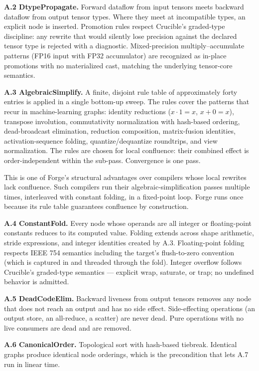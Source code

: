 \textbf{A.2 DtypePropagate.}
Forward dataflow from input tensors meets backward dataflow from output tensor types.
Where they meet at incompatible types, an explicit  node is inserted.
Promotion rules respect Crucible's graded-type discipline: any rewrite that would silently lose precision against the declared tensor type is rejected with a diagnostic.
Mixed-precision multiply--accumulate patterns (FP16 input with FP32 accumulator) are recognized as in-place promotions with no materialized cast, matching the underlying tensor-core semantics.

\textbf{A.3 AlgebraicSimplify.}
A finite, disjoint rule table of approximately forty entries is applied in a single bottom-up sweep.
The rules cover the patterns that recur in machine-learning graphs: identity reductions ($x \cdot 1 = x$, $x + 0 = x$), transpose involution, commutativity normalization with hash-based ordering, dead-broadcast elimination, reduction composition, matrix-fusion identities, activation-sequence folding, quantize/dequantize roundtrips, and view normalization.
The rules are chosen for local confluence: their combined effect is order-independent within the sub-pass.
Convergence is one pass.

This is one of Forge's structural advantages over compilers whose local rewrites lack confluence.
Such compilers run their algebraic-simplification passes multiple times, interleaved with constant folding, in a fixed-point loop.
Forge runs once because its rule table guarantees confluence by construction.

\textbf{A.4 ConstantFold.}
Every  node whose operands are all integer or floating-point constants reduces to its computed value.
Folding extends across shape arithmetic, stride expressions, and integer identities created by A.3.
Floating-point folding respects IEEE 754 semantics including the target's flush-to-zero convention (which is captured in  and threaded through the fold).
Integer overflow follows Crucible's graded-type semantics --- explicit wrap, saturate, or trap; no undefined behavior is admitted.

\textbf{A.5 DeadCodeElim.}
Backward liveness from output tensors removes any node that does not reach an output and has no side effect.
Side-effecting operations (an output store, an all-reduce, a scatter) are never dead.
Pure operations with no live consumers are dead and are removed.

\textbf{A.6 CanonicalOrder.}
Topological sort with hash-based tiebreak.
Identical graphs produce identical node orderings, which is the precondition that lets A.7 run in linear time.

